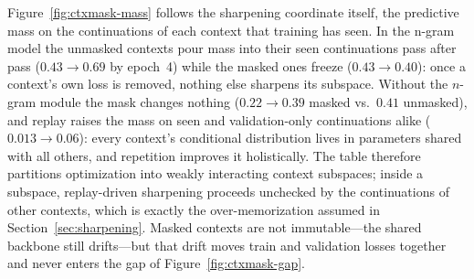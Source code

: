 Figure~\ref{fig:ctxmask-mass} follows the sharpening coordinate itself, the predictive mass on the continuations of each context that training has seen. In the n-gram model the unmasked contexts pour mass into their seen continuations pass after pass ($0.43\to0.69$ by epoch~4) while the masked ones freeze ($0.43\to0.40$): once a context's own loss is removed, nothing else sharpens its subspace. Without the $n$-gram module the mask changes nothing ($0.22\to0.39$ masked vs.\ $0.41$ unmasked), and replay raises the mass on seen and validation-only continuations alike ($0.013\to0.06$): every context's conditional distribution lives in parameters shared with all others, and repetition improves it holistically. The table therefore partitions optimization into weakly interacting context subspaces; inside a subspace, replay-driven sharpening proceeds unchecked by the continuations of other contexts, which is exactly the over-memorization assumed in Section~\ref{sec:sharpening}. Masked contexts are not immutable---the shared backbone still drifts---but that drift moves train and validation losses together and never enters the gap of Figure~\ref{fig:ctxmask-gap}.

